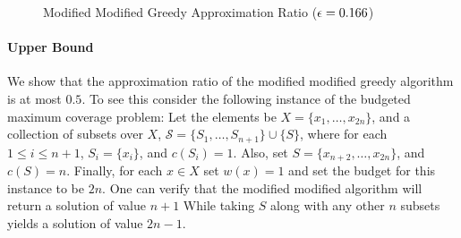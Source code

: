 \begin{figure}
\caption{
\label{fig:mmgreedy}
Modified Modified Greedy Approximation Ratio ($\epsilon = 0.166$)
}
\end{figure}

\paragraph{Upper Bound}
We show that the approximation ratio of the modified modified greedy algorithm is at most $0.5$.
To see this consider the following instance of the budgeted maximum coverage problem:
Let the elements be $X = \{x_1, \dots, x_{2n}\}$, 
and a collection of subsets over $X$, $\mathcal{S} = \{S_1, \dots, S_{n + 1}\} \cup \{S\}$,
where for each $1 \leq i \leq n + 1$, $S_i = \{x_i\}$, and $c(S_i) = 1$. 
Also, set $S = \{x_{n + 2}, \dots, x_{2n}\}$, and $c(S) = n$.
Finally, for each $x \in X$ set $w(x) = 1$ and set the budget for this instance to be $2n$.
One can verify that the modified modified algorithm will return a solution of value $n + 1$
While taking $S$ along with any other $n$ subsets yields a solution of value $2n - 1$.  



